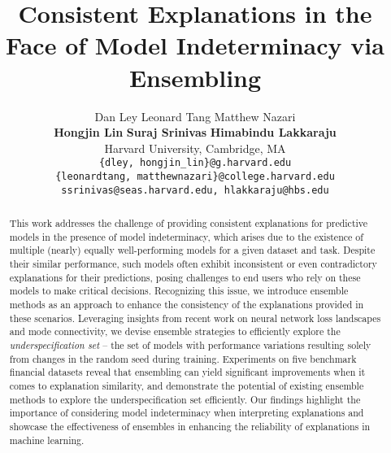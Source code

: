 \documentclass{article}
\title{Consistent Explanations in the Face of Model Indeterminacy via Ensembling}
\author{%
Dan Ley \quad Leonard Tang \quad Matthew Nazari \\
\textbf{Hongjin Lin} \quad \textbf{Suraj Srinivas} \quad \textbf{Himabindu Lakkaraju} \\
Harvard University, Cambridge, MA\\
\texttt{\{dley, hongjin\_lin\}@g.harvard.edu}\\
\texttt{\{leonardtang, matthewnazari\}@college.harvard.edu}\\
\texttt{ssrinivas@seas.harvard.edu, hlakkaraju@hbs.edu}
}
\begin{document}
\maketitle


\begin{abstract}
This work addresses the challenge of providing consistent explanations for predictive models in the presence of model indeterminacy, which arises due to the existence of multiple (nearly) equally well-performing models for a given dataset and task. Despite their similar performance, such models often exhibit inconsistent or even contradictory explanations for their predictions, posing challenges to end users who rely on these models to make critical decisions. Recognizing this issue, we introduce ensemble methods as an approach to enhance the consistency of the explanations provided in these scenarios. Leveraging insights from recent work on neural network loss landscapes and mode connectivity, we devise ensemble strategies to efficiently explore the \textit{underspecification set} -- the set of models with performance variations resulting solely from changes in the random seed during training. Experiments on five benchmark financial datasets reveal that ensembling can yield significant improvements when it comes to explanation similarity, and demonstrate the potential of existing ensemble methods to explore the underspecification set efficiently. Our findings highlight the importance of considering model indeterminacy when interpreting explanations and showcase the effectiveness of ensembles in enhancing the reliability of explanations in machine learning.
\end{abstract}







%

\pagebreak




\appendix


\end{document}
